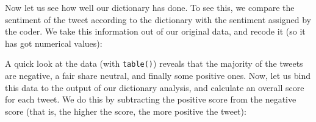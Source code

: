 \documentclass[
]{book}
\newenvironment{Shaded}{\begin{snugshade}}{\end{snugshade}}
\newcommand{\FunctionTok}[1]{\textcolor[rgb]{0.13,0.29,0.53}{\textbf{#1}}}
\newcommand{\NormalTok}[1]{#1}
\newcommand{\OtherTok}[1]{\textcolor[rgb]{0.56,0.35,0.01}{#1}}
\newcommand{\SpecialCharTok}[1]{\textcolor[rgb]{0.81,0.36,0.00}{\textbf{#1}}}
\newcommand{\StringTok}[1]{\textcolor[rgb]{0.31,0.60,0.02}{#1}}
\begin{document}
Now let us see how well our dictionary has done. To see this, we compare the sentiment of the tweet according to the dictionary with the sentiment assigned by the coder. We take this information out of our original data, and recode it (so it has got numerical values):

\begin{Shaded}
\end{Shaded}

A quick look at the data (with \texttt{table()}) reveals that the majority of the tweets are negative, a fair share neutral, and finally some positive ones. Now, let us bind this data to the output of our dictionary analysis, and calculate an overall score for each tweet. We do this by subtracting the positive score from the negative score (that is, the higher the score, the more positive the tweet):

\begin{Shaded}
\end{Shaded}
\end{document}
